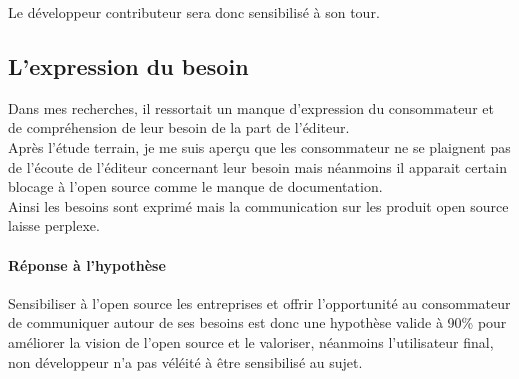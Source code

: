 		Le développeur contributeur sera donc sensibilisé à son tour.

	\subsection{L'expression du besoin}

		Dans mes recherches, il ressortait un manque d'expression du consommateur et de compréhension de leur besoin de la part de l'éditeur.\\

		Après l'étude terrain, je me suis aperçu que les consommateur ne se plaignent pas de l'écoute de l'éditeur concernant leur besoin mais néanmoins il apparait certain blocage à l'open source comme le manque de documentation.\\

		Ainsi les besoins sont exprimé mais la communication sur les produit open source laisse perplexe.

\paragraph{Réponse à l'hypothèse\\}

		Sensibiliser à l'open source les entreprises et offrir l'opportunité au consommateur de communiquer autour de ses besoins est donc une hypothèse valide à 90\% pour améliorer la vision de l'open source et le valoriser, néanmoins l'utilisateur final, non développeur n'a pas véléité à être sensibilisé au sujet.










